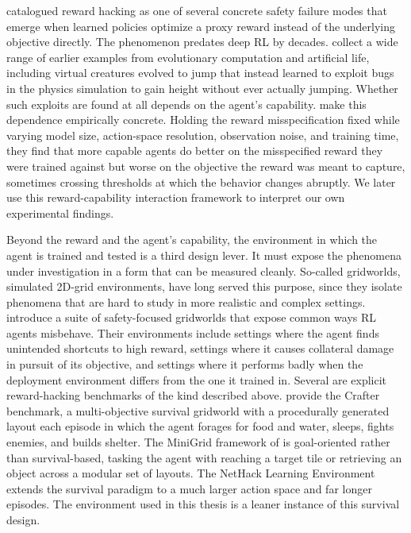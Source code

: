 \documentclass[12pt,a4paper,titlepage]{article}
\begin{document}
\citet{Amodei2016} catalogued reward hacking as one of several concrete safety failure modes that emerge when learned policies optimize a proxy reward instead of the underlying objective directly. The phenomenon predates deep RL by decades. \citet{Lehman2020} collect a wide range of earlier examples from evolutionary computation and artificial life, including virtual creatures evolved to jump that instead learned to exploit bugs in the physics simulation to gain height without ever actually jumping. Whether such exploits are found at all depends on the agent's capability. \citet{Pan2022} make this dependence empirically concrete. Holding the reward misspecification fixed while varying model size, action-space resolution, observation noise, and training time, they find that more capable agents do better on the misspecified reward they were trained against but worse on the objective the reward was meant to capture, sometimes crossing thresholds at which the behavior changes abruptly. We later use this reward-capability interaction framework to interpret our own experimental findings.

Beyond the reward and the agent's capability, the environment in which the agent is trained and tested is a third design lever. It must expose the phenomena under investigation in a form that can be measured cleanly. So-called gridworlds, simulated 2D-grid environments, have long served this purpose, since they isolate phenomena that are hard to study in more realistic and complex settings. \citet{Leike2017} introduce a suite of safety-focused gridworlds that expose common ways RL agents misbehave. Their environments include settings where the agent finds unintended shortcuts to high reward, settings where it causes collateral damage in pursuit of its objective, and settings where it performs badly when the deployment environment differs from the one it trained in. Several are explicit reward-hacking benchmarks of the kind described above. \citet{Hafner2022} provide the Crafter benchmark, a multi-objective survival gridworld with a procedurally generated layout each episode in which the agent forages for food and water, sleeps, fights enemies, and builds shelter. The MiniGrid framework of \citet{ChevalierBoisvert2023} is goal-oriented rather than survival-based, tasking the agent with reaching a target tile or retrieving an object across a modular set of layouts. The NetHack Learning Environment \citep{Kuttler2020} extends the survival paradigm to a much larger action space and far longer episodes. The environment used in this thesis is a leaner instance of this survival design.
\end{document}
